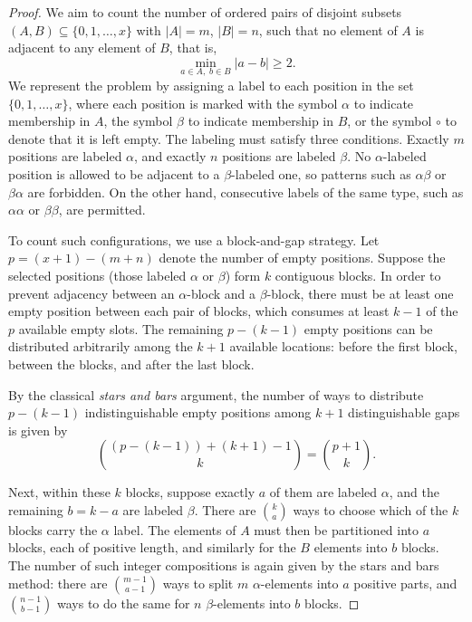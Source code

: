 \documentclass{birkjour}
\theoremstyle{definition}
\theoremstyle{remark}
\numberwithin{equation}{section}
\begin{document}
\begin{proof}
We aim to count the number of ordered pairs of disjoint subsets \( (A, B) \subseteq \{0,1,\dots,x\} \) with \( |A| = m \), \( |B| = n \), such that no element of \( A \) is adjacent to any element of \( B \), that is,
\[
\min_{a \in A,\; b \in B} |a - b| \geq 2.
\]
We represent the problem by assigning a label to each position in the set \( \{0, 1, \dots, x\} \), where each position is marked with the symbol \( \alpha \) to indicate membership in \( A \), the symbol \( \beta \) to indicate membership in \( B \), or the symbol \( \circ \) to denote that it is left empty. The labeling must satisfy three conditions. Exactly \( m \) positions are labeled \( \alpha \), and exactly \( n \) positions are labeled \( \beta \). No \( \alpha \)-labeled position is allowed to be adjacent to a \( \beta \)-labeled one, so patterns such as \( \alpha\beta \) or \( \beta\alpha \) are forbidden. On the other hand, consecutive labels of the same type, such as \( \alpha\alpha \) or \( \beta\beta \), are permitted.

To count such configurations, we use a block-and-gap strategy. Let \( p = (x+1) - (m + n) \) denote the number of empty positions. Suppose the selected positions (those labeled \( \alpha \) or \( \beta \)) form \( k \) contiguous blocks. In order to prevent adjacency between an \( \alpha \)-block and a \( \beta \)-block, there must be at least one empty position between each pair of blocks, which consumes at least \( k - 1 \) of the \( p \) available empty slots. The remaining \( p - (k - 1) \) empty positions can be distributed arbitrarily among the \( k+1 \) available locations: before the first block, between the blocks, and after the last block.

By the classical \emph{stars and bars} argument, the number of ways to distribute \( p - (k - 1) \) indistinguishable empty positions among \( k + 1 \) distinguishable gaps is given by
\[
\binom{(p - (k - 1)) + (k + 1) - 1}{k} = \binom{p + 1}{k}.
\]

Next, within these \( k \) blocks, suppose exactly \( a \) of them are labeled \( \alpha \), and the remaining \( b = k - a \) are labeled \( \beta \). There are \( \binom{k}{a} \) ways to choose which of the \( k \) blocks carry the \( \alpha \) label. The elements of \( A \) must then be partitioned into \( a \) blocks, each of positive length, and similarly for the \( B \) elements into \( b \) blocks. The number of such integer compositions is again given by the stars and bars method: there are \( \binom{m - 1}{a - 1} \) ways to split \( m \) \( \alpha \)-elements into \( a \) positive parts, and \( \binom{n - 1}{b - 1} \) ways to do the same for \( n \) \( \beta \)-elements into \( b \) blocks.


\end{proof}
\end{document}
